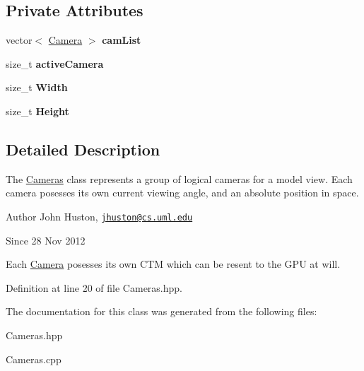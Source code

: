 \subsection*{\-Private \-Attributes}
\begin{DoxyCompactItemize}
\item 
\hypertarget{class_cameras_a7411a5eef4362af369217ea8e37cffd3}{vector$<$ \hyperlink{class_camera}{\-Camera} $>$ {\bfseries cam\-List}}\label{class_cameras_a7411a5eef4362af369217ea8e37cffd3}

\item 
\hypertarget{class_cameras_a3327a3104975b11b6f144ccba0720c49}{size\-\_\-t {\bfseries active\-Camera}}\label{class_cameras_a3327a3104975b11b6f144ccba0720c49}

\item 
\hypertarget{class_cameras_af3a40020076cbdbffbbbddf4b83e6f74}{size\-\_\-t {\bfseries \-Width}}\label{class_cameras_af3a40020076cbdbffbbbddf4b83e6f74}

\item 
\hypertarget{class_cameras_a073073118b02de2c7c4aa29dcff1587a}{size\-\_\-t {\bfseries \-Height}}\label{class_cameras_a073073118b02de2c7c4aa29dcff1587a}

\end{DoxyCompactItemize}


\subsection{\-Detailed \-Description}
\-The \hyperlink{class_cameras}{\-Cameras} class represents a group of logical cameras for a model view. \-Each camera posesses its own current viewing angle, and an absolute position in space. 

\begin{DoxyAuthor}{\-Author}
\-John \-Huston, \href{mailto:jhuston@cs.uml.edu}{\tt jhuston@cs.\-uml.\-edu} 
\end{DoxyAuthor}
\begin{DoxySince}{\-Since}
28 \-Nov 2012
\end{DoxySince}
\-Each \hyperlink{class_camera}{\-Camera} posesses its own \-C\-T\-M which can be resent to the \-G\-P\-U at will. 

\-Definition at line 20 of file \-Cameras.\-hpp.



\-The documentation for this class was generated from the following files\-:\begin{DoxyCompactItemize}
\item 
\-Cameras.\-hpp\item 
\-Cameras.\-cpp\end{DoxyCompactItemize}
